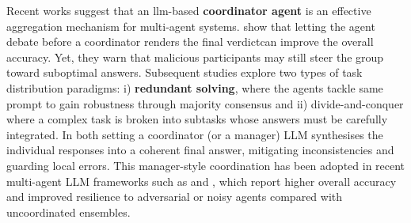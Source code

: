 Recent works suggest that an llm-based \textbf{coordinator agent} is an effective aggregation mechanism for multi-agent systems. \cite{MA-LLM-debate} show that letting the agent debate before a coordinator renders the final verdictcan improve the overall accuracy. Yet, they warn that malicious participants may still steer the group toward suboptimal answers. Subsequent studies explore two types of task distribution paradigms: i) \textbf{redundant solving}, where the agents tackle same prompt to gain robustness through majority consensus and ii) divide-and-conquer where a complex task is broken into subtasks whose answers must be carefully integrated. In both setting a coordinator (or a manager) LLM synthesises the individual responses into a coherent final answer, mitigating inconsistencies and guarding local errors.
This manager-style coordination has been adopted in recent multi-agent LLM frameworks such as \cite{CoA} and \cite{MoA}, which report higher overall accuracy and improved resilience to adversarial or noisy agents compared with uncoordinated ensembles.





